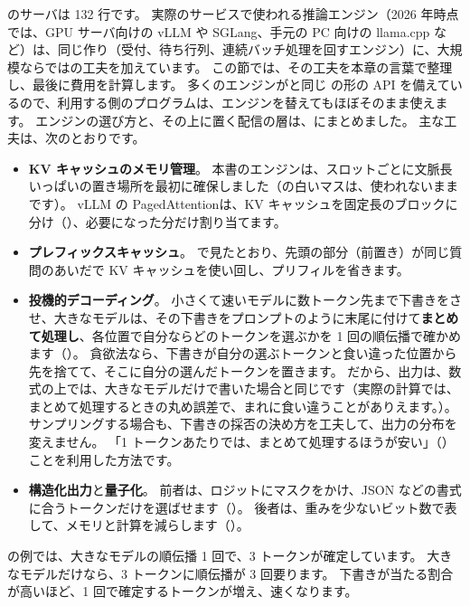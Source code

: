 のサーバは 132 行です。
実際のサービスで使われる推論エンジン（2026 年時点では、GPU サーバ向けの vLLM や SGLang、手元の PC 向けの llama.cpp など）は、同じ作り（受付、待ち行列、連続バッチ処理を回すエンジン）に、大規模ならではの工夫を加えています。
この節では、その工夫を本章の言葉で整理し、最後に費用を計算します。
多くのエンジンがと同じ  の形の API を備えているので、利用する側のプログラムは、エンジンを替えてもほぼそのまま使えます。
エンジンの選び方と、その上に置く配信の層は、にまとめました。
主な工夫は、次のとおりです。
\begin{itemize}
\item \textbf{KV キャッシュのメモリ管理}。
本書のエンジンは、スロットごとに文脈長いっぱいの置き場所を最初に確保しました（の白いマスは、使われないままです）。
vLLM の PagedAttention\cite{kwon2023efficient}は、KV キャッシュを固定長のブロックに分け（）、必要になった分だけ割り当てます。
\item \textbf{プレフィックスキャッシュ}。
で見たとおり、先頭の部分（前置き）が同じ質問のあいだで KV キャッシュを使い回し、プリフィルを省きます。
\item \textbf{投機的デコーディング}\cite{leviathan2023fast}。
小さくて速いモデルに数トークン先まで下書きをさせ、大きなモデルは、その下書きをプロンプトのように末尾に付けて\textbf{まとめて処理し}、各位置で自分ならどのトークンを選ぶかを 1 回の順伝播で確かめます（）。
貪欲法なら、下書きが自分の選ぶトークンと食い違った位置から先を捨てて、そこに自分の選んだトークンを置きます。
だから、出力は、数式の上では、大きなモデルだけで書いた場合と同じです（実際の計算では、まとめて処理するときの丸め誤差で、まれに食い違うことがありえます。）。
サンプリングする場合も、下書きの採否の決め方を工夫して、出力の分布を変えません。
「1 トークンあたりでは、まとめて処理するほうが安い」（）ことを利用した方法です。
\item \textbf{構造化出力}と\textbf{量子化}。
前者は、ロジットにマスクをかけ、JSON などの書式に合うトークンだけを選ばせます（）。
後者は、重みを少ないビット数で表して、メモリと計算を減らします（）。
\end{itemize}

の例では、大きなモデルの順伝播 1 回で、3 トークンが確定しています。
大きなモデルだけなら、3 トークンに順伝播が 3 回要ります。
下書きが当たる割合が高いほど、1 回で確定するトークンが増え、速くなります。

